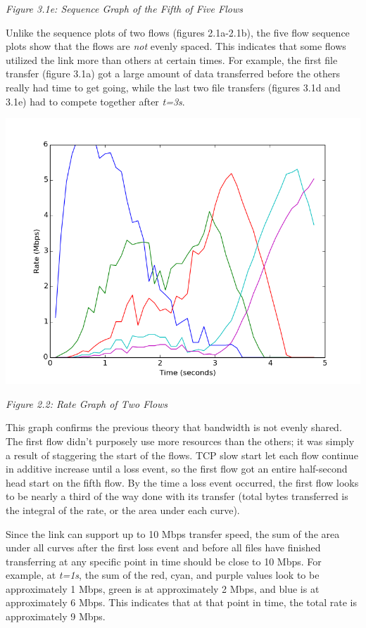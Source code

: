 \documentclass[11pt]{article}
\begin{document}
\centerline{\emph{Figure 3.1e: Sequence Graph of the Fifth of Five Flows}}

Unlike the sequence plots of two flows (figures 2.1a-2.1b), the five flow sequence plots show that the flows are \emph{not} evenly spaced. This indicates that some flows utilized the link more than others at certain times. For example, the first file transfer (figure 3.1a) got a large amount of data transferred before the others really had time to get going, while the last two file transfers (figures 3.1d and 3.1e) had to compete together after \emph{t=3s}.


\includegraphics[width=17cm]{outputs/fiveflows/fiveflows_rate.png}

\centerline{\emph{Figure 2.2: Rate Graph of Two Flows}}

This graph confirms the previous theory that bandwidth is not evenly shared. The first flow didn't purposely use more resources than the others; it was simply a result of staggering the start of the flows. TCP slow start let each flow continue in additive increase until a loss event, so the first flow got an entire half-second head start on the fifth flow. By the time a loss event occurred, the first flow looks to be nearly a third of the way done with its transfer (total bytes transferred is the integral of the rate, or the area under each curve). 

Since the link can support up to 10 Mbps transfer speed, the sum of the area under all curves after the first loss event and before all files have finished transferring at any specific point in time should be close to 10 Mbps. For example, at \emph{t=1s}, the sum of the red, cyan, and purple values look to be approximately 1 Mbps, green is at approximately 2 Mbps, and blue is at approximately 6 Mbps. This indicates that at that point in time, the total rate is approximately 9 Mbps.
\end{document}
